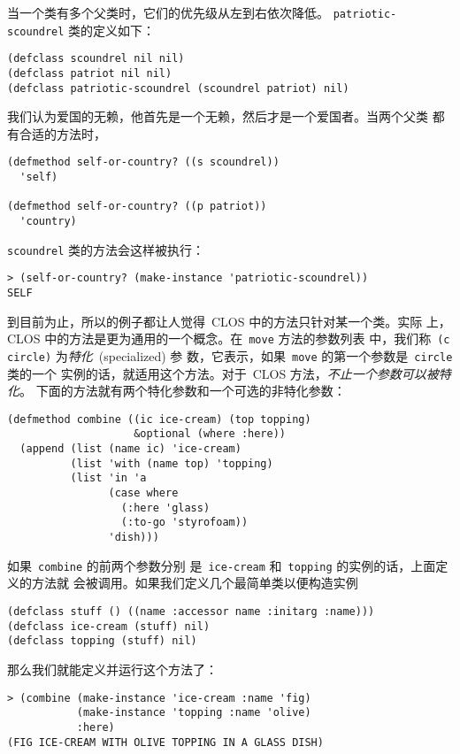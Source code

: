 当一个类有多个父类时，它们的优先级从左到右依次降低。
\texttt{patriotic-scoundrel} 类的定义如下：
\begin{lstlisting}
(defclass scoundrel nil nil)
(defclass patriot nil nil)
(defclass patriotic-scoundrel (scoundrel patriot) nil)
\end{lstlisting}
我们认为爱国的无赖，他首先是一个无赖，然后才是一个爱国者。当两个父类
都有合适的方法时，
\begin{lstlisting}
(defmethod self-or-country? ((s scoundrel))
  'self)

(defmethod self-or-country? ((p patriot))
  'country)
\end{lstlisting}
\texttt{scoundrel} 类的方法会这样被执行：
\begin{lstlisting}
> (self-or-country? (make-instance 'patriotic-scoundrel))
SELF
\end{lstlisting}

到目前为止，所以的例子都让人觉得~CLOS 中的方法只针对某一个类。实际
上，CLOS 中的方法是更为通用的一个概念。在~\texttt{move} 方法的参数列表
中，我们称~\verb|(c circle)| 为\emph{特化}~(specialized) 参
数，它表示，如果~\texttt{move} 的第一个参数是~\texttt{circle} 类的一个
实例的话，就适用这个方法。对于~CLOS 方法，\emph{不止一个参数可以被特化}。
下面的方法就有两个特化参数和一个可选的非特化参数：
\begin{lstlisting}
(defmethod combine ((ic ice-cream) (top topping)
                    &optional (where :here))
  (append (list (name ic) 'ice-cream)
          (list 'with (name top) 'topping)
          (list 'in 'a
                (case where
                  (:here 'glass)
                  (:to-go 'styrofoam))
                'dish)))
\end{lstlisting}
如果~\texttt{combine} 的前两个参数分别
是~\texttt{ice-cream} 和~\texttt{topping} 的实例的话，上面定义的方法就
会被调用。如果我们定义几个最简单类以便构造实例
\begin{lstlisting}
(defclass stuff () ((name :accessor name :initarg :name)))
(defclass ice-cream (stuff) nil)
(defclass topping (stuff) nil)
\end{lstlisting}
那么我们就能定义并运行这个方法了：
\begin{lstlisting}
> (combine (make-instance 'ice-cream :name 'fig)
           (make-instance 'topping :name 'olive)
           :here)
(FIG ICE-CREAM WITH OLIVE TOPPING IN A GLASS DISH)
\end{lstlisting}

